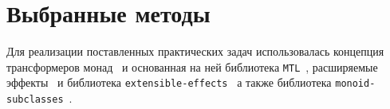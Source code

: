 \section{Выбранные методы}

Для реализации поставленных практических задач использовалась концепция 
трансформеров монад~\cite{monadTransformers} и основанная на ней библиотека
\lstinline{MTL}~\cite{mtlHackage}, расширяемые эффекты~\cite{extEffects} 
и библиотека \lstinline{extensible-effects}~\cite{extensibleEffectsHackage} а также библиотека
\lstinline{monoid-subclasses}~\cite{monoidSubclassesHackage}.